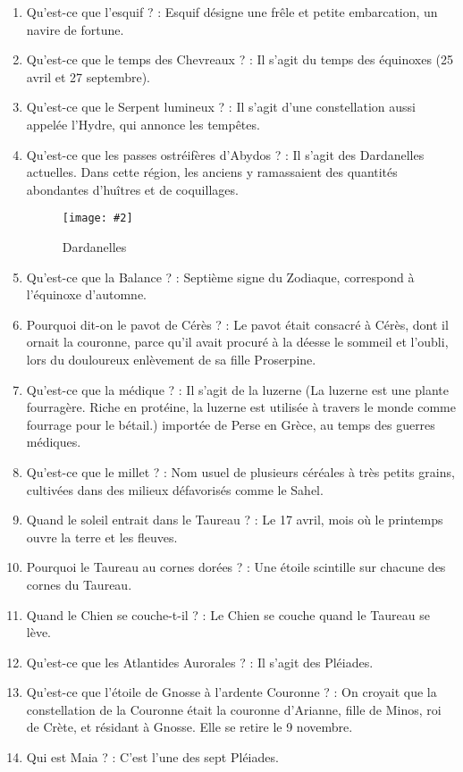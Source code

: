 \documentclass[a4paper, 11pt, hidelinks]{article}
\newcommand{\img}[4]{\begin{figure}[!ht]
    \centering
    \texttt{[image: \#2]}
    \caption{#3}
    \label{#4}
    \end{figure} }
\begin{document}
\begin{enumerate}
      \item Qu'est-ce que l'esquif ? : Esquif désigne une frêle et petite embarcation, un navire de fortune.
      \item Qu'est-ce que le temps des Chevreaux ? : Il s'agit du temps des équinoxes (25 avril et 27 septembre).
      \item Qu'est-ce que le Serpent lumineux ? : Il s'agit d'une constellation aussi appelée l'Hydre, qui annonce les tempêtes.
      \item Qu'est-ce que les passes ostréifères d'Abydos ? : Il s'agit des Dardanelles actuelles. Dans cette région, les anciens y ramassaient
            des quantités abondantes d'huîtres et de coquillages.
            \img{0.4}{Dardanelles.png}{Dardanelles}{34}
      \item Qu'est-ce que la Balance ? : Septième signe du Zodiaque, correspond à l'équinoxe d'automne.
      \item Pourquoi dit-on le pavot de Cérès ? : Le pavot était consacré à Cérès, dont il ornait la couronne, parce qu'il avait procuré
            à la déesse le sommeil et l'oubli, lors du douloureux enlèvement de sa fille Proserpine.
      \item Qu'est-ce que la médique ? : Il s'agit de la luzerne (La luzerne est une plante fourragère. Riche en protéine, la luzerne est utilisée à
            travers le monde comme fourrage pour le bétail.) importée de Perse en Grèce, au temps des guerres médiques.
      \item Qu'est-ce que le millet ? : Nom usuel de plusieurs céréales à très petits grains, cultivées dans des milieux défavorisés comme le Sahel.
      \item Quand le soleil entrait dans le Taureau ? : Le 17 avril, mois où le printemps ouvre la terre et les fleuves.
      \item Pourquoi le Taureau au cornes dorées ? : Une étoile scintille sur chacune des cornes du Taureau.
      \item Quand le Chien se couche-t-il ? : Le Chien se couche quand le Taureau se lève.
      \item Qu'est-ce que les Atlantides Aurorales ? : Il s'agit des Pléiades.
      \item Qu'est-ce que l'étoile de Gnosse à l'ardente Couronne ? : On croyait que la constellation de la Couronne était la couronne d'Arianne,
            fille de Minos, roi de Crète, et résidant à Gnosse. Elle se retire le 9 novembre.
      \item Qui est Maia ? : C'est l'une des sept Pléiades.

\end{enumerate}
\end{document}
